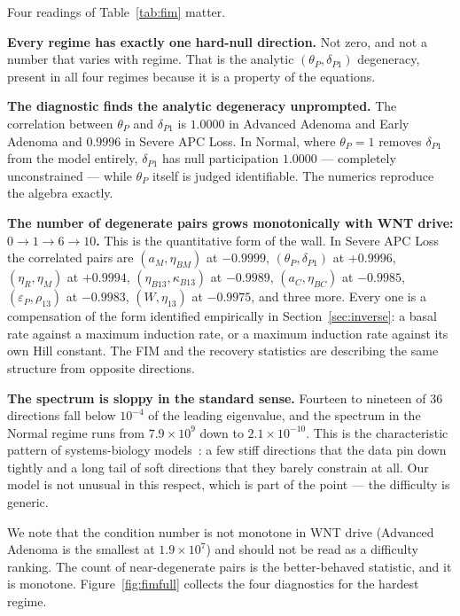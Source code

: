 \documentclass[11pt]{article}
\newcommand{\thP}{\theta_P}
\begin{document}
Four readings of Table~\ref{tab:fim} matter.

\textbf{Every regime has exactly one hard-null direction.} Not zero, and not a
number that varies with regime. That is the analytic
$(\thP,\delta_{P1})$ degeneracy, present in all four regimes because it is a
property of the equations.

\textbf{The diagnostic finds the analytic degeneracy unprompted.} The
correlation between $\thP$ and $\delta_{P1}$ is $1.0000$ in Advanced Adenoma
and Early Adenoma and $0.9996$ in Severe APC Loss. In Normal, where $\thP = 1$
removes $\delta_{P1}$ from the model entirely, $\delta_{P1}$ has null
participation $1.0000$ --- completely unconstrained --- while $\thP$ itself is
judged identifiable. The numerics reproduce the algebra exactly.

\textbf{The number of degenerate pairs grows monotonically with WNT drive:
$0 \to 1 \to 6 \to 10$.} This is the quantitative form of the wall. In Severe
APC Loss the correlated pairs are $(a_M, \eta_{BM})$ at $-0.9999$,
$(\thP, \delta_{P1})$ at $+0.9996$, $(\eta_R, \eta_M)$ at $+0.9994$,
$(\eta_{B13}, \kappa_{B13})$ at $-0.9989$, $(a_C, \eta_{BC})$ at $-0.9985$,
$(\varepsilon_P, \rho_{13})$ at $-0.9983$, $(W, \eta_{13})$ at $-0.9975$, and
three more. Every one is a compensation of the form identified empirically in
Section~\ref{sec:inverse}: a basal rate against a maximum induction rate, or a
maximum induction rate against its own Hill constant. The FIM and the recovery
statistics are describing the same structure from opposite directions.

\textbf{The spectrum is sloppy in the standard sense.} Fourteen to nineteen of
36 directions fall below $10^{-4}$ of the leading eigenvalue, and the spectrum
in the Normal regime runs from $7.9\times10^{9}$ down to $2.1\times10^{-10}$.
This is the characteristic pattern of systems-biology
models~\citep{gutenkunst2007sloppy,transtrum2011geometry}: a few stiff
directions that the data pin down tightly and a long tail of soft directions
that they barely constrain at all. Our model is not unusual in this respect,
which is part of the point --- the difficulty is generic.

We note that the condition number is not monotone in WNT drive (Advanced
Adenoma is the smallest at $1.9\times10^{7}$) and should not be read as a
difficulty ranking. The count of near-degenerate pairs is the better-behaved
statistic, and it is monotone. Figure~\ref{fig:fimfull} collects the four
diagnostics for the hardest regime.
\end{document}
